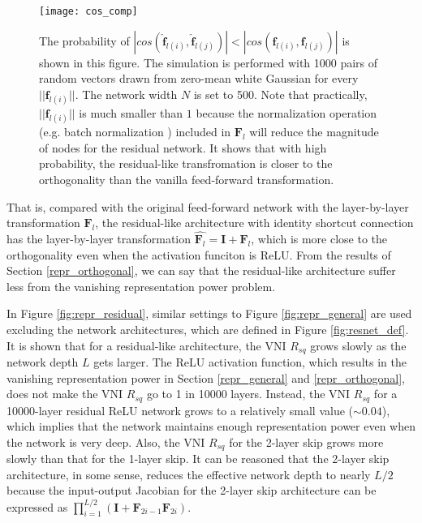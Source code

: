 \begin{figure}[h]
    \centering
    \texttt{[image: cos\_comp]}
    \caption[Numerical simulation for \eqref{res_cosine}]
    {The probability of 
    $|cos(\widehat{\mathbf{f}}_{l(i)}, \widehat{\mathbf{f}}_{l(j)})|<|cos(\mathbf{f}_{l(i)}, \mathbf{f}_{l(j)})|$
    is shown in this figure.
    The simulation is performed with 1000 pairs of random vectors drawn from zero-mean white Gaussian
    for every $||\mathbf{f}_{l(i)}||$.
    The network width $N$ is set to 500.
    Note that practically, $||\mathbf{f}_{l(i)}||$ is much smaller than $1$ because the 
    normalization operation (e.g. batch normalization \cite{batchnorm}) included in $\mathbf{F}_l$
    will reduce the magnitude of nodes for the residual network.
    It shows that with high probability, the residual-like transfromation is closer to the
    orthogonality than the vanilla feed-forward transformation.}
    \label{cosine_comp}
\end{figure}

That is, compared with the original feed-forward network with the layer-by-layer transformation
$\mathbf{F}_l$, the residual-like architecture with identity shortcut connection has the
layer-by-layer transformation $\widehat{\mathbf{F}_l}=\mathbf{I}+\mathbf{F}_l$,
which is more close to the orthogonality even when the activation funciton is ReLU.
From the results of Section \ref{repr_orthogonal}, we can say that the residual-like architecture
suffer less from the vanishing representation power problem.

In Figure \ref{fig:repr_residual}, similar settings to Figure \ref{fig:repr_general} are 
used excluding the network architectures, which are defined in Figure \ref{fig:resnet_def}.
It is shown that for a residual-like architecture, the VNI $R_{sq}$ grows slowly as the network
depth $L$ gets larger. The ReLU activation function, which results in the vanishing representation
power in Section \ref{repr_general} and \ref{repr_orthogonal}, does not make the VNI $R_{sq}$ go
to 1 in 10000 layers. Instead, the VNI $R_{sq}$ for a 10000-layer residual ReLU network grows to a
relatively small value ($\sim0.04$), which implies that the network maintains enough representation
power even when the network is very deep.
Also, the VNI $R_{sq}$ for the 2-layer skip grows more slowly than that for the 1-layer skip. It 
can be reasoned that the 2-layer skip architecture, in some sense, reduces the effective network depth
to nearly $L/2$ because the input-output Jacobian for the 2-layer skip architecture can be
expressed as $\prod_{i=1}^{L/2}(\mathbf{I}+\mathbf{F}_{2i-1}\mathbf{F}_{2i})$.

